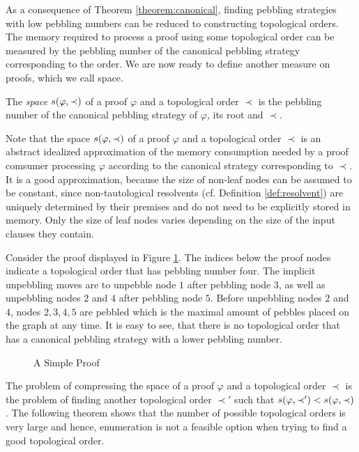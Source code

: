 As a consequence of Theorem \ref{theorem:canonical}, finding pebbling strategies with low pebbling numbers can be reduced to constructing topological orders.
The memory required to process a proof using some topological order can be measured by the pebbling number of the canonical pebbling strategy corresponding to the order.
We are now ready to define another measure on proofs, which we call space.

\begin{definition}
\label{def:space measure}
The \emph{space} $s(\varphi,\prec)$ 
of a proof $\varphi$ and a topological order $\prec$ is the pebbling number of the canonical pebbling strategy of $\varphi$, its root and $\prec$.
\end{definition}

Note that the space $s(\varphi,\prec)$ of a proof $\varphi$ and a topological order $\prec$ is an abstract idealized approximation of the memory consumption needed by a proof comsumer processing $\varphi$ according to the canonical strategy corresponding to $\prec$. It is a good approximation, because the size of non-leaf nodes can be assumed to be constant, since non-tautological resolvents (cf. Definition \ref{def:resolvent}) are uniquely determined by their premises and do not need to be explicitly stored in memory. Only the size of leaf nodes varies depending on the size of the input clauses they contain.


\begin{example}

Consider the proof displayed in Figure \ref{fig:spaceproof}.
The indices below the proof nodes indicate a topological order that has pebbling number four.
The implicit unpebbling moves are to unpebble node $1$ after pebbling node $3$, as well as unpebbling nodes $2$ and $4$ after pebbling node $5$.
Before unpebbling nodes $2$ and $4$, nodes $2,3,4,5$ are pebbled which is the maximal amount of pebbles placed on the graph at any time.
It is easy to see, that there is no topological order that has a canonical pebbling strategy with a lower pebbling number.

\begin{figure}[!h]

\caption{A Simple Proof}
\label{fig:spaceproof}
\end{figure}

\end{example}

The problem of compressing the space of a proof $\varphi$ and a topological order $\prec$ is the problem of finding another topological order $\prec'$ such that $s(\varphi,\prec') < s(\varphi,\prec)$. The following theorem shows that the number of possible topological orders is very large and hence, enumeration is not a feasible option when trying to find a good topological order.

